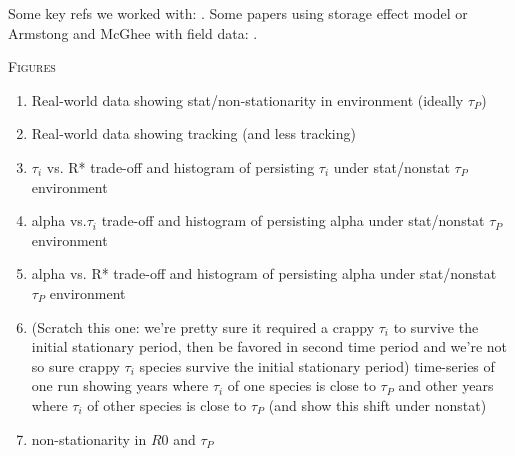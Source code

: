 \documentclass[11pt,letterpaper]{article}
\renewcommand{\section}[1]{%
\bigskip
\begin{center}
\begin{Large}
\normalfont\scshape #1
\medskip
\end{Large}
\end{center}}
\begin{document}
\noindent Some key refs we worked with:
\citep{Chesson:1993gi,Chesson:2000ak,Chesson:2000vd,Chesson:2004eo}. Some
papers using storage effect model or Armstong and McGhee with field
data: \citep{Angert:2009,Kuang:2008ri,Kuang:2009rj,Levine:2009ym}.


\newpage
\section{Figures}
\begin{enumerate}
\item Real-world data showing stat/non-stationarity in environment (ideally $\tau_{P}$) 
\item Real-world data showing tracking (and less tracking)
\item $\tau_{i}$ vs. R* trade-off and histogram of persisting $\tau_i$ under stat/nonstat $\tau_{P}$ environment
\item alpha vs.$\tau_i$ trade-off and histogram of persisting alpha under stat/nonstat $\tau_{P}$ environment
\item alpha vs. R* trade-off and histogram of persisting alpha under stat/nonstat $\tau_{P}$ environment
\item (Scratch this one: we're pretty sure it required a crappy $\tau_i$ to survive the initial stationary period, then be favored in second time period and we're not so sure crappy $\tau_i$ species survive the initial stationary period) time-series of one run showing years where $\tau_i$ of one species is close to $\tau_{P}$ and other years where $\tau_i$ of other species is close to $\tau_{P}$ (and show this shift under nonstat)
\item non-stationarity in $R0$ and $\tau_{P}$
\end{enumerate}





\end{document}
